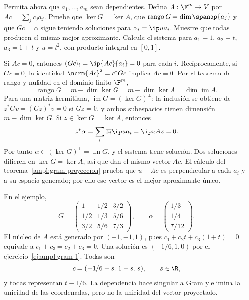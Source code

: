 \begin{ejercicio}\label{ej:ampl-gram-5}
Permita ahora que $a_1,\ldots,a_m$ sean dependientes. Defina $A:\F^m\to V$ por $Ac=\sum_jc_ja_j$. Pruebe que $\ker G=\ker A$, que $\operatorname{rango}G=\dim\spanop\{a_j\}$ y que $Gc=\alpha$ sigue teniendo soluciones para $\alpha_i=\ip u{a_i}$. Muestre que todas producen el mismo mejor aproximante. Calcule el sistema para $a_1=1$, $a_2=t$, $a_3=1+t$ y $u=t^2$, con producto integral en $[0,1]$.
\end{ejercicio}
\begin{solucion}
Si $Ac=0$, entonces $(Gc)_i=\ip{Ac}{a_i}=0$ para cada $i$. Recíprocamente, si $Gc=0$, la identidad $\norm{Ac}^2=c^*Gc$ implica $Ac=0$. Por el teorema de rango y nulidad en el dominio finito $\F^m$,
\[
 \operatorname{rango}G=m-\dim\ker G
 =m-\dim\ker A=\dim\operatorname{im}A.
\]
Para una matriz hermitiana, $\operatorname{im}G=(\ker G)^\perp$: la inclusión se obtiene de $z^*Gv=(Gz)^*v=0$ si $Gz=0$, y ambos subespacios tienen dimensión $m-\dim\ker G$. Si $z\in\ker G=\ker A$, entonces
\[
 z^*\alpha=\sum_i\overline{z_i}\ip u{a_i}=\ip u{Az}=0.
\]
Por tanto $\alpha\in(\ker G)^\perp=\operatorname{im}G$, y el sistema tiene solución. Dos soluciones difieren en $\ker G=\ker A$, así que dan el mismo vector $Ac$. El cálculo del teorema~\ref{ampl:gram-proyeccion} prueba que $u-Ac$ es perpendicular a cada $a_i$ y a su espacio generado; por ello ese vector es el mejor aproximante único.

En el ejemplo,
\[
 G=\begin{pmatrix}
 1&1/2&3/2\\1/2&1/3&5/6\\3/2&5/6&7/3
 \end{pmatrix},\qquad
 \alpha=\begin{pmatrix}1/3\\1/4\\7/12\end{pmatrix}.
\]
El núcleo de $A$ está generado por $(-1,-1,1)$, pues $c_1+c_2t+c_3(1+t)=0$ equivale a $c_1+c_3=c_2+c_3=0$. Una solución es $(-1/6,1,0)$ por el ejercicio~\ref{ej:ampl-gram-1}. Todas son
\[
 c=(-1/6-s,\,1-s,\,s),\qquad s\in\R,
\]
y todas representan $t-1/6$. La dependencia hace singular a Gram y elimina la unicidad de las coordenadas, pero no la unicidad del vector proyectado.
\end{solucion}

